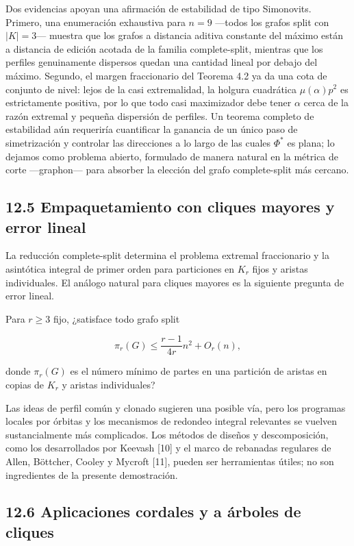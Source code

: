 \documentclass[
  11pt,
]{article}
\begin{document}
Dos evidencias apoyan una afirmación de estabilidad de tipo Simonovits.
Primero, una enumeración exhaustiva para \(n=9\) ---todos los grafos
split con \(|K|=3\)--- muestra que los grafos a distancia aditiva
constante del máximo están a distancia de edición acotada de la familia
complete-split, mientras que los perfiles genuinamente dispersos quedan
una cantidad lineal por debajo del máximo. Segundo, el margen
fraccionario del Teorema 4.2 ya da una cota de conjunto de nivel: lejos
de la casi extremalidad, la holgura cuadrática \(\mu(\alpha)p^2\) es
estrictamente positiva, por lo que todo casi maximizador debe tener
\(\alpha\) cerca de la razón extremal y pequeña dispersión de perfiles.
Un teorema completo de estabilidad aún requeriría cuantificar la
ganancia de un único paso de simetrización y controlar las direcciones a
lo largo de las cuales \(\Phi^*\) es plana; lo dejamos como problema
abierto, formulado de manera natural en la métrica de corte
---graphon--- para absorber la elección del grafo complete-split más
cercano.

\subsection{12.5 Empaquetamiento con cliques mayores y error
lineal}\label{empaquetamiento-con-cliques-mayores-y-error-lineal}

La reducción complete-split determina el problema extremal fraccionario
y la asintótica integral de primer orden para particiones en \(K_r\)
fijos y aristas individuales. El análogo natural para cliques mayores es
la siguiente pregunta de error lineal.

Para \(r\ge3\) fijo, ¿satisface todo grafo split

\[
\pi_r(G)
\le
\frac{r-1}{4r}n^2+O_r(n),
\]

donde \(\pi_r(G)\) es el número mínimo de partes en una partición de
aristas en copias de \(K_r\) y aristas individuales?

Las ideas de perfil común y clonado sugieren una posible vía, pero los
programas locales por órbitas y los mecanismos de redondeo integral
relevantes se vuelven sustancialmente más complicados. Los métodos de
diseños y descomposición, como los desarrollados por Keevash {[}10{]} y
el marco de rebanadas regulares de Allen, Böttcher, Cooley y Mycroft
{[}11{]}, pueden ser herramientas útiles; no son ingredientes de la
presente demostración.

\subsection{12.6 Aplicaciones cordales y a árboles de
cliques}\label{aplicaciones-cordales-y-a-uxe1rboles-de-cliques}
\end{document}
